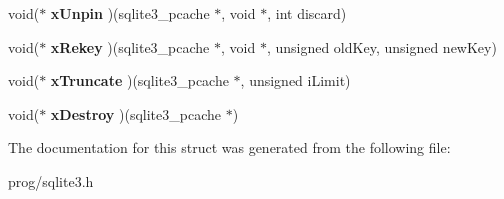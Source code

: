 \begin{DoxyCompactItemize}
void($\ast$ {\bfseries x\+Unpin} )(sqlite3\+\_\+pcache $\ast$, void $\ast$, int discard)
\item 
\mbox{\label{structsqlite3__pcache__methods_a0d8a7a980e22e908429a181f8fc7733e}} 
void($\ast$ {\bfseries x\+Rekey} )(sqlite3\+\_\+pcache $\ast$, void $\ast$, unsigned old\+Key, unsigned new\+Key)
\item 
\mbox{\label{structsqlite3__pcache__methods_adc097defb1e83c6442fc0d47ac79cec9}} 
void($\ast$ {\bfseries x\+Truncate} )(sqlite3\+\_\+pcache $\ast$, unsigned i\+Limit)
\item 
\mbox{\label{structsqlite3__pcache__methods_ac775533f86db1d15bf7e4ded0e037eaf}} 
void($\ast$ {\bfseries x\+Destroy} )(sqlite3\+\_\+pcache $\ast$)
\end{DoxyCompactItemize}


The documentation for this struct was generated from the following file\+:\begin{DoxyCompactItemize}
\item 
prog/sqlite3.\+h\end{DoxyCompactItemize}
